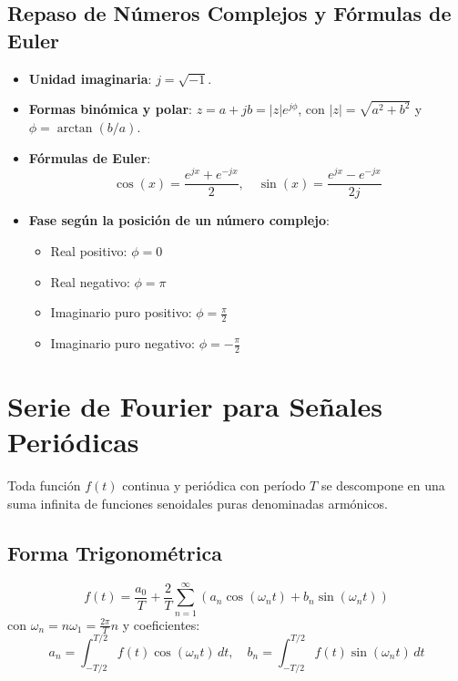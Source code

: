 \subsection{Repaso de Números Complejos y Fórmulas de Euler}
\begin{itemize}[leftmargin=*]
    \item \textbf{Unidad imaginaria}: $j = \sqrt{-1}$.
    \item \textbf{Formas binómica y polar}: $z = a + j b = |z| e^{j \phi}$, con $|z| = \sqrt{a^2 + b^2}$ y $\phi = \arctan(b/a)$.
    \item \textbf{Fórmulas de Euler}:
    \begin{equation}
        \cos(x) = \frac{e^{jx} + e^{-jx}}{2}, \quad \sin(x) = \frac{e^{jx} - e^{-jx}}{2j}
    \end{equation}
    \item \textbf{Fase según la posición de un número complejo}:
    \begin{itemize}
        \item Real positivo: $\phi = 0$
        \item Real negativo: $\phi = \pi$
        \item Imaginario puro positivo: $\phi = \frac{\pi}{2}$
        \item Imaginario puro negativo: $\phi = -\frac{\pi}{2}$
    \end{itemize}
\end{itemize}

\newpage
\section{Serie de Fourier para Señales Periódicas}

Toda función $f(t)$ continua y periódica con período $T$ se descompone en una suma infinita de funciones senoidales puras denominadas armónicos.

\subsection{Forma Trigonométrica}
\begin{equation}
    f(t) = \frac{a_0}{T} + \frac{2}{T} \sum_{n=1}^{\infty} \left( a_n \cos(\omega_n t) + b_n \sin(\omega_n t) \right)
\end{equation}
con $\omega_n = n \omega_1 = \frac{2\pi}{T} n$ y coeficientes:
\begin{equation}
    a_n = \int_{-T/2}^{T/2} f(t) \cos(\omega_n t) \, dt, \quad b_n = \int_{-T/2}^{T/2} f(t) \sin(\omega_n t) \, dt
\end{equation}


